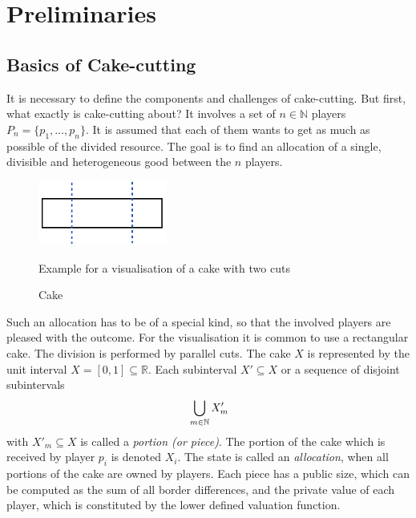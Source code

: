 \section{Preliminaries}
\subsection{Basics of Cake-cutting}
It is necessary to define the components and challenges of cake-cutting. But first, what exactly is cake-cutting about? It involves a set of $n \in \mathbb{N}$ players $P_n=\{p_1,\ldots,p_n\}$. It is assumed that each of them wants to get as much as possible of the divided resource. The goal is to find an allocation of a single, divisible and heterogeneous good between the $n$ players.  
	\begin{figure}[h]
		\centering
 		 \includegraphics[width=120pt]{kek.pdf}
   \caption{Cake}Example for a visualisation of a cake with two cuts
  	 \end{figure} 
Such an allocation has to be of a special kind, so that the involved players are pleased with the outcome. For the visualisation it is common to use a rectangular cake. The division is performed by parallel cuts. The cake $X$ is represented by the unit interval $X=[0,1] \subseteq \mathbb{R}$. Each subinterval $X'\subseteq X$ or a sequence of disjoint subintervals $$\sideset{}{ }\bigcup\limits_{m\in\mathbb{N}}X'_m$$
with $X'_m\subseteq X$ is called a \emph{portion (or piece)}. The portion of the cake which is received by player $p_i$ is denoted $X_i$. The state is called an \emph{allocation}, when all portions of the cake are owned by players. Each piece has a public size, which can be computed as the sum of all border differences, and the private value of each player, which is constituted by the lower defined valuation function.\\

